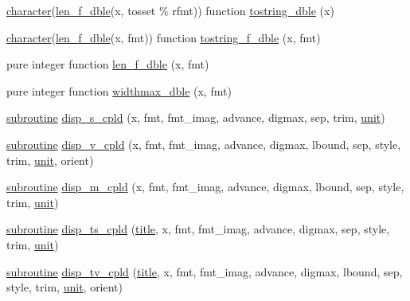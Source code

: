 \begin{DoxyCompactItemize}
\item 
\hyperlink{option__stopwatch_83_8txt_abd4b21fbbd175834027b5224bfe97e66}{character}(\hyperlink{namespacem__display_aa013a639d5b0f7e40b627c9d712693f0}{len\+\_\+f\+\_\+dble}(x, tosset \% rfmt)) function \hyperlink{namespacem__display_a0b5ebf70cd08a5bffc132707049bcef6}{tostring\+\_\+dble} (x)
\item 
\hyperlink{option__stopwatch_83_8txt_abd4b21fbbd175834027b5224bfe97e66}{character}(\hyperlink{namespacem__display_aa013a639d5b0f7e40b627c9d712693f0}{len\+\_\+f\+\_\+dble}(x, fmt)) function \hyperlink{namespacem__display_af82ac5edf2d812767205ea93974885d6}{tostring\+\_\+f\+\_\+dble} (x, fmt)
\item 
pure integer function \hyperlink{namespacem__display_aa013a639d5b0f7e40b627c9d712693f0}{len\+\_\+f\+\_\+dble} (x, fmt)
\item 
pure integer function \hyperlink{namespacem__display_aed07125464a462f9fa53ed2333846273}{widthmax\+\_\+dble} (x, fmt)
\item 
\hyperlink{M__stopwatch_83_8txt_acfbcff50169d691ff02d4a123ed70482}{subroutine} \hyperlink{namespacem__display_ae8bac9197ad0a43b71cd5e43a0a20cec}{disp\+\_\+s\+\_\+cpld} (x, fmt, fmt\+\_\+imag, advance, digmax, sep, trim, \hyperlink{M__stopwatch_83_8txt_a5cbef30eb7c0d734bd82f5a7ebea9aa7}{unit})
\item 
\hyperlink{M__stopwatch_83_8txt_acfbcff50169d691ff02d4a123ed70482}{subroutine} \hyperlink{namespacem__display_a4934b217ec0cb576fd840b46b8a7dba2}{disp\+\_\+v\+\_\+cpld} (x, fmt, fmt\+\_\+imag, advance, digmax, lbound, sep, style, trim, \hyperlink{M__stopwatch_83_8txt_a5cbef30eb7c0d734bd82f5a7ebea9aa7}{unit}, orient)
\item 
\hyperlink{M__stopwatch_83_8txt_acfbcff50169d691ff02d4a123ed70482}{subroutine} \hyperlink{namespacem__display_a0d50709ce2ad1894b93d80086584059a}{disp\+\_\+m\+\_\+cpld} (x, fmt, fmt\+\_\+imag, advance, digmax, lbound, sep, style, trim, \hyperlink{M__stopwatch_83_8txt_a5cbef30eb7c0d734bd82f5a7ebea9aa7}{unit})
\item 
\hyperlink{M__stopwatch_83_8txt_acfbcff50169d691ff02d4a123ed70482}{subroutine} \hyperlink{namespacem__display_a24143f6afc313e16d2a8961067ec9019}{disp\+\_\+ts\+\_\+cpld} (\hyperlink{print__watch_83_8txt_a15b5bd21156bb9fca6a755ab8c029a9c}{title}, x, fmt, fmt\+\_\+imag, advance, digmax, sep, style, trim, \hyperlink{M__stopwatch_83_8txt_a5cbef30eb7c0d734bd82f5a7ebea9aa7}{unit})
\item 
\hyperlink{M__stopwatch_83_8txt_acfbcff50169d691ff02d4a123ed70482}{subroutine} \hyperlink{namespacem__display_a72a8a9d86a421f827f6c5d499f5f50b2}{disp\+\_\+tv\+\_\+cpld} (\hyperlink{print__watch_83_8txt_a15b5bd21156bb9fca6a755ab8c029a9c}{title}, x, fmt, fmt\+\_\+imag, advance, digmax, lbound, sep, style, trim, \hyperlink{M__stopwatch_83_8txt_a5cbef30eb7c0d734bd82f5a7ebea9aa7}{unit}, orient)

\end{DoxyCompactItemize}
